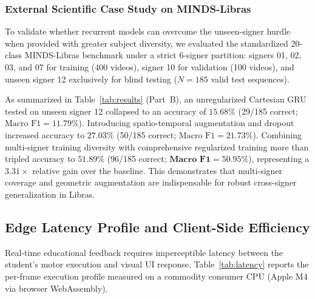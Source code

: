 \documentclass[12pt,a4paper]{article}
\begin{document}
\subsubsection{External Scientific Case Study on MINDS-Libras}

To validate whether recurrent models can overcome the unseen-signer hurdle when provided with greater subject diversity, we evaluated the standardized 20-class MINDS-Libras benchmark under a strict 6-signer partition: signers 01, 02, 03, and 07 for training (400 videos), signer 10 for validation (100 videos), and unseen signer 12 exclusively for blind testing ($N = 185$ valid test sequences).

As summarized in Table~\ref{tab:results} (Part~B), an unregularized Cartesian GRU tested on unseen signer 12 collapsed to an accuracy of $15.68\%$ (29/185 correct; $\text{Macro F1} = 11.79\%$). Introducing spatio-temporal augmentation and dropout increased accuracy to $27.03\%$ (50/185 correct; $\text{Macro F1} = 21.73\%$). Combining multi-signer training diversity with comprehensive regularized training more than tripled accuracy to $\mathbf{51.89\%}$ (96/185 correct; $\mathbf{\text{Macro F1} = 50.95\%}$), representing a $3.31\times$ relative gain over the baseline. This demonstrates that multi-signer coverage and geometric augmentation are indispensable for robust cross-signer generalization in Libras.

\subsection{Edge Latency Profile and Client-Side Efficiency}

Real-time educational feedback requires imperceptible latency between the student's motor execution and visual UI response. Table~\ref{tab:latency} reports the per-frame execution profile measured on a commodity consumer CPU (Apple M4 via browser WebAssembly).
\end{document}
